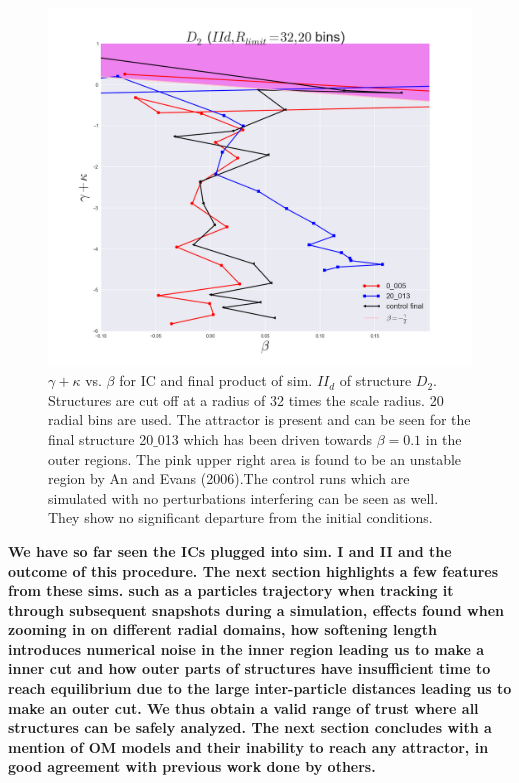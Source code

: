 \begin{figure}[!htbp]
\centering
\includegraphics[width=1.0\linewidth]{img/beta_vs_gamma_plus_kappa_IId_D2_Rlimit32.png}
\caption{$\gamma + \kappa$ vs. $\beta$ for IC and final product of sim. $II_d$ of structure $D_2$.
Structures are cut off at a radius of 32 times the scale radius. 20 radial bins are used.
The attractor is present and can be seen for the final structure 20$\_$013 which has been driven towards $\beta = 0.1$ in the outer regions. The pink upper right area is found to be an unstable region by An and Evans (2006).The control runs which are simulated with no perturbations interfering can be seen as well. They show no significant departure from the initial conditions.}
\label{fig:test}
\end{figure}

\textbf{We have so far seen the ICs plugged into sim. I and II and the outcome of this procedure.
The next section highlights a few features from these sims. such as a particles trajectory when tracking it through subsequent snapshots during a simulation, effects found when zooming in on different radial domains, how softening length introduces numerical noise in the inner region leading us to make a inner cut and how outer parts of structures have insufficient time to reach equilibrium due to the large inter-particle distances leading us to make an outer cut. We thus obtain a valid range of trust where all structures can be safely analyzed. The next section concludes with a mention of OM models and their inability to reach any attractor, in good agreement with previous work done by others.}
